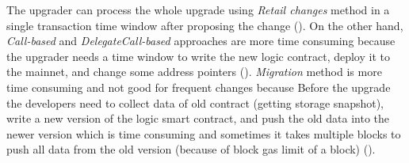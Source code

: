 The upgrader can process the whole upgrade using \textit{Retail changes} method in a single transaction time window after proposing the change (\CIRCLE). On the other hand, \textit{Call-based} and \textit{DelegateCall-based} approaches are more time consuming because the upgrader needs a time window to write the new logic contract, deploy it to the mainnet, and change some address pointers (\LEFTcircle). \textit{Migration} method is more time consuming and not good for frequent changes because Before the upgrade the developers need to collect data of old contract (\eg getting storage snapshot), write a new version of the logic smart contract, and push the old data into the newer version which is time consuming and sometimes it takes multiple blocks to push all data from the old version (because of block gas limit of a block) (\Circle).

 

 
